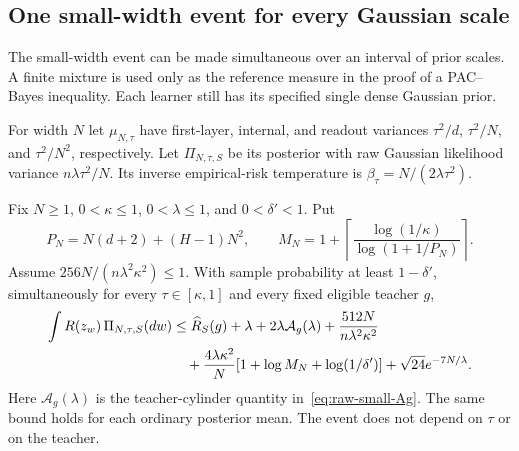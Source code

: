 \subsection{One small-width event for every Gaussian scale}
\label{sec:simultaneous-scale-pacbayes}

The small-width event can be made simultaneous over an interval of
prior scales.  A finite mixture is used only as the reference measure
in the proof of a PAC--Bayes inequality.  Each learner still has its
specified single dense Gaussian prior.

For width $N$ let $\mu_{N,\tau}$ have first-layer, internal, and readout
variances $\tau^2/d$, $\tau^2/N$, and $\tau^2/N^2$, respectively.
Let $\Pi_{N,\tau,S}$ be its posterior with raw Gaussian likelihood
variance $n\lambda\tau^2/N$.  Its inverse empirical-risk temperature is
$\beta_\tau=N/(2\lambda\tau^2)$.

\begin{lemma}
\label{lem:simultaneous-scale-small-width}
Fix $N\geq1$, $0<\kappa\leq1$, $0<\lambda\leq1$, and
$0<\delta'<1$.  Put
\[
 P_N=N(d+2)+(H-1)N^2,\qquad
 M_N=1+\left\lceil
       \frac{\log(1/\kappa)}{\log(1+1/P_N)}\right\rceil.
\]
Assume $256N/(n\lambda^2\kappa^2)\leq1$.
With sample probability at least $1-\delta'$, simultaneously for every
$\tau\in[\kappa,1]$ and every fixed eligible teacher $g$,
\begin{align}
 \int R(z_w)\,\Pi_{N,\tau,S}(dw)
 &\leq\widehat R_S(g)+\lambda+2\lambda\mathcal A_g(\lambda)
       +\frac{512N}{n\lambda^2\kappa^2}\notag\\
 &\quad+\frac{4\lambda\kappa^2}{N}
       [1+\log M_N+\log(1/\delta')]
       +\sqrt{24}e^{-7N/\lambda}.
 \label{eq:simultaneous-scale-small-bound}
\end{align}
Here $\mathcal A_g(\lambda)$ is the teacher-cylinder quantity
in~\eqref{eq:raw-small-Ag}.  The same bound holds for each ordinary
posterior mean.  The event does not depend on $\tau$ or on the teacher.
\end{lemma}

